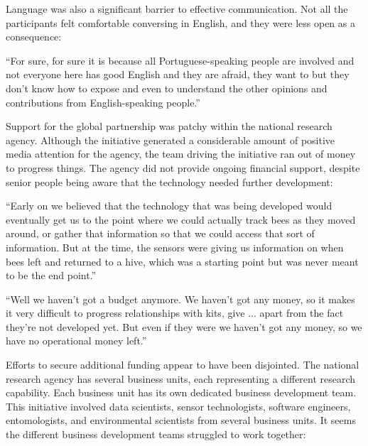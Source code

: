 Language was also a significant barrier to effective communication. Not all the participants felt comfortable conversing in English, and they were less open as a consequence:

\begin{displayquote}[Participant 9/3]
\small
\enquote{For sure, for sure it is because all Portuguese-speaking people are involved and not everyone here has good English and they are afraid, they want to but they don't know how to expose and even to understand the other opinions and contributions from English-speaking people.} 
\end{displayquote}

Support for the global partnership was patchy within the national research agency. Although the initiative generated a considerable amount of positive media attention for the agency, the team driving the initiative ran out of money to progress things. The agency did not provide ongoing financial support, despite senior people being aware that the technology needed further development:

\begin{displayquote}[Participant 22/3]
\small
\enquote{Early on we believed that the technology that was being developed would eventually get us to the point where we could actually track bees as they moved around, or gather that information so that we could access that sort of information. But at the time, the sensors were giving us information on when bees left and returned to a hive, which was a starting point but was never meant to be the end point.} 
\end{displayquote}

\begin{displayquote}[Participant 13/3]
\small
\enquote{Well we haven't got a budget anymore.  We haven't got any money, so it makes it very difficult to progress relationships with kits, give ... apart from the fact they're not developed yet. But even if they were we haven't got any money, so we have no operational money left.} 
\end{displayquote}

Efforts to secure additional funding appear to have been disjointed. The national research agency has several business units, each representing a different research capability. Each business unit has its own dedicated business development team. This initiative involved data scientists, sensor technologists, software engineers, entomologists, and environmental scientists from several business units. It seems the different business development teams struggled to work together:

